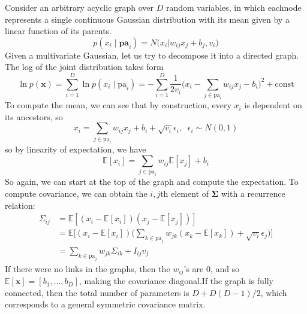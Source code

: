   \begin{example}
    Consider an arbitrary acyclic graph over $D$ random variables, in which eachnode represents a single continuous Gaussian distribution with its mean given by a linear function of its parents. 
    \[p(x_i \mid \mathbf{pa}_i) = N \bigg( x_i \bigg| w_{ij} x_j + b_j, v_i \bigg) \]
    Given a multivariate Gaussian, let us try to decompose it into a directed graph. The log of the joint distribution takes form 
    \[\ln p(\mathbf{x}) = \sum_{i=1}^D \ln p(x_i \mid \mathrm{pa}_i) = - \sum_{i=1}^D \frac{1}{2 v_i} \bigg( x_i - \sum_{j \in \mathrm{pa}_i} w_{ij} x_j - b_i \bigg)^2 + \mathrm{const}\]
    To compute the mean, we can see that by construction, every $x_i$ is dependent on its ancestors, so 
    \[x_i = \sum_{j \in \mathrm{pa}_i} w_{ij} x_j + b_i + \sqrt{v_i} \epsilon_i, \;\; \epsilon_i \sim N(0, 1)\]
    so by linearity of expectation, we have 
    \[\mathbb{E}[x_i] = \sum_{j \in \mathrm{pa}_i} w_{ij} \mathbb{E}[x_j] + b_i\]
    So again, we can start at the top of the graph and compute the expectation. To compute covariance, we can obtain the $i, j$th element of $\boldsymbol{\Sigma}$ with a recurrence relation: 
    \begin{align*} 
      \Sigma_{ij} & = \mathbb{E}[ (x_i - \mathbb{E}[x_i]) (x_j - \mathbb{E}[x_j])] \\
                  & = \mathbb{E} \bigg[ (x_i - \mathbb{E}[x_i]) \bigg( \sum_{k \in \mathrm{pa}_j} w_{j k} (x_k - \mathbb{E}[x_k])  + \sqrt{v_i} \epsilon_j\bigg) \bigg] \\
                  & = \sum_{k \in \mathrm{pa}_j} w_{j k} \Sigma_{ik} + I_{ij} v_j
    \end{align*}
    If there were no links in the graphs, then the $w_{ij}$'s are $0$, and so $\mathbb{E}[\mathbf{x}] = [b_1, \ldots, b_D]$, making the covariance diagonal.If the graph is fully connected, then the total number of parameters is $D + D(D-1)/2$, which corresponds to a general symmetric covariance matrix.  
  \end{example}

